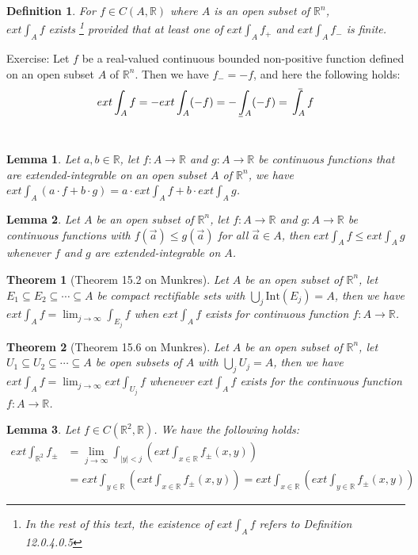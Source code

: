 \documentclass[15pt]{book}
\theoremstyle{break}
\theoremstyle{break}
\newtheorem{thm}{Theorem}[section]
\newtheorem{lem}{Lemma}[thm]
\newtheorem{defn}{Definition}[corL]
\def\upint{\mathchoice%
    {\mkern13mu\overline{\vphantom{\intop}\mkern7mu}\mkern-20mu}%
    {\mkern7mu\overline{\vphantom{\intop}\mkern7mu}\mkern-14mu}%
    {\mkern7mu\overline{\vphantom{\intop}\mkern7mu}\mkern-14mu}%
    {\mkern7mu\overline{\vphantom{\intop}\mkern7mu}\mkern-14mu}%
  \int}
\def\lowint{\mkern3mu\underline{\vphantom{\intop}\mkern7mu}\mkern-10mu\int}
\newcommand{\R}{\mathbb{R}}
\newcommand{\Int}{\text{Int}}
\newcommand{\exercise}{\color{green}Exercise: \color{black}}
\begin{document}
\begin{defn}
For $f \in C(A,\R)$ where $A$ is an open subset of $\R^n$, \\$ext \int_A f$ exists \footnote{In the rest of this text, the existence of $ext \int_A f$ refers to Definition 12.0.4.0.5} provided that at least one of $ext \int_A f_+$ and $ext \int_A f_-$ is finite.
\end{defn}


\exercise Let $f$ be a real-valued continuous bounded non-positive function defined on an open subset $A $ of $\R^n$. Then we have $f_- = -f$, and here the following holds:
$$ext \int_A f = -ext\int_A (-f) = -\lowint_A (-f) = \upint_A f$$ \\

\begin{lem}
Let $a,b\in \R$, let $f:A \to \R$ and $g:A \to \R$ be continuous functions that are extended-integrable on an open subset $A$ of $\R^n$, we have $ext \int_A (a\cdot f+b\cdot g) = a\cdot ext\int_A f + b \cdot ext\int_A g$.
\end{lem}

\begin{lem}
Let $A$ be an open subset of $\R^n$, let $f:A \to \R$ and $g:A \to \R$ be continuous functions with $f(\vec{a})\leq g(\vec{a})$ for all $\vec{a}\in A$, then $ext \int_A f \leq ext \int_A g$ whenever $f$ and $g$ are extended-integrable on $A$. 
\end{lem}

\begin{thm}[Theorem 15.2 on Munkres]
Let $A$ be an open subset of $\R^n$, let $E_1 \subseteq E_2\subseteq \cdots \subseteq A$ be compact rectifiable sets with $\bigcup_j \Int(E_j) = A$, then we have $ext\int_A f = \lim_{j\to \infty} \int_{E_j} f$ when $ext\int_A f $ exists for continuous function $f:A \to \R$.
\end{thm}

\begin{thm}[Theorem 15.6 on Munkres] 
Let $A$ be an open subset of $\R^n$, let $U_1 \subseteq U_2 \subseteq \cdots \subseteq A$ be open subsets of $A$ with $\bigcup_j U_j = A$, then we have $ext \int_A f = \lim_{j \to \infty} ext \int_{U_j} f$ whenever $ext\int_A f $ exists for the continuous function $f:A \to \R$. 
\end{thm}

\begin{lem}
Let $f \in C\left(\R^2,\R\right)$. We have the following holds:
\begin{align*}
ext \int_{\R^2} f_\pm &= \lim_{j\to \infty} \int_{|y|<j} \left(ext\int_{x \in \R} f_\pm\left(x,y\right)\right) \\&= ext\int_{y\in \R} \left(ext\int_{x \in \R} f_\pm\left(x,y\right)\right) = ext \int_{x \in \R} \left(ext\int_{y \in \R} f_\pm\left(x,y\right)\right)
\end{align*}
\end{lem}
\end{document}
